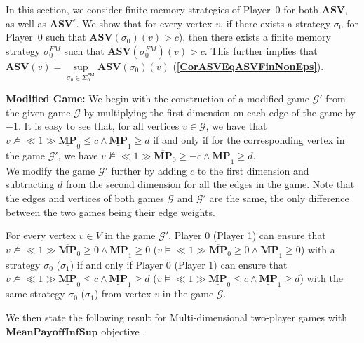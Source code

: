 In this section, we consider finite memory strategies of Player~$0$ for both $\mathbf{ASV}$, as well as $\mathbf{ASV}^\epsilon$. We show that for every vertex $v$, if there exists a strategy $\sigma_0$ for Player~0 such that $\mathbf{ASV}(\sigma_0)(v) > c$), then there exists a finite memory strategy $\sigma_0^{FM}$ such that $\mathbf{ASV}(\sigma_0^{FM})(v) > c$. This further implies that $\mathbf{ASV}(v) = \sup\limits_{\sigma_0 \in \Sigma_0^{\mathsf{FM}}} \mathbf{ASV}(\sigma_0)(v)$ (\textbf{\cref{CorASVEqASVFinNonEps}}).

\textbf{Modified Game:} We begin with the construction of a modified game $\mathcal{G'}$ from the given game $\mathcal{G}$ by multiplying the first dimension on each edge of the game by $-1$. It is easy to see that, for all vertices $v \in \mathcal{G}$, we have that $v \nvDash \ll 1 \gg \underline{\mathbf{MP}}_0 \leqslant c \land \underline{\mathbf{MP}}_1 \geqslant d$ if and only if for the corresponding vertex in the game $\mathcal{G'}$, we have $v \nvDash \ll 1 \gg \overline{\mathbf{MP}}_0 \geqslant -c \land \underline{\mathbf{MP}}_1 \geqslant d$.\\ 
\noindent We modify the game $\mathcal{G'}$ further by adding $c$ to the first dimension and subtracting $d$ from the second dimension for all the edges in the game. Note that the edges and vertices of both games $\mathcal{G}$ and $\mathcal{G'}$ are the same, the only difference between the two games being their edge weights.

\begin{proposition}
\label{PropGameStrEqNewGameStrNonEps}
For every vertex $v \in V$ in the game $\mathcal{G'}$, Player 0 (Player 1) can ensure that $v \nvDash \ll 1 \gg \overline{\mathbf{MP}}_0 \geqslant 0 \land \underline{\mathbf{MP}}_1 \geqslant 0$ ($v \models \ll 1 \gg \overline{\mathbf{MP}}_0 \geqslant 0 \land \underline{\mathbf{MP}}_1 \geqslant 0$) with a strategy $\sigma_0$ ($\sigma_1$) if and only if Player 0 (Player 1) can ensure that $v \nvDash \ll 1 \gg \underline{\mathbf{MP}}_0 \leqslant c \land \underline{\mathbf{MP}}_1 \geqslant d$ ($v \models \ll 1 \gg \underline{\mathbf{MP}}_0 \leqslant c \land \underline{\mathbf{MP}}_1 \geqslant d$) with the same strategy $\sigma_0$ ($\sigma_1$) from vertex $v$ in the game $\mathcal{G}$.
\end{proposition}

We then state the following result for Multi-dimensional two-player games with $\mathbf{MeanPayoffInfSup}$ objective \cite{VCDHRR15}.

